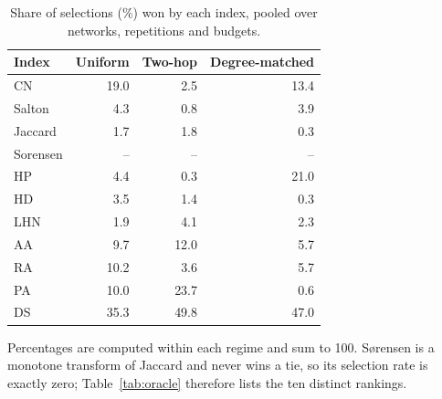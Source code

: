 \begin{table}[htbp]
\centering
\footnotesize
\caption{Share of selections (\%) won by each index, pooled over networks, repetitions and budgets.}
\label{tab:methods}
\begin{tabular}{l r r r}
\toprule
Index & Uniform & Two-hop & Degree-matched \\
\midrule
CN & 19.0 & 2.5 & 13.4 \\
Salton & 4.3 & 0.8 & 3.9 \\
Jaccard & 1.7 & 1.8 & 0.3 \\
Sorensen & -- & -- & -- \\
HP & 4.4 & 0.3 & 21.0 \\
HD & 3.5 & 1.4 & 0.3 \\
LHN & 1.9 & 4.1 & 2.3 \\
AA & 9.7 & 12.0 & 5.7 \\
RA & 10.2 & 3.6 & 5.7 \\
PA & 10.0 & 23.7 & 0.6 \\
DS & 35.3 & 49.8 & 47.0 \\
\bottomrule
\end{tabular}
\par\vspace{2pt}\begin{minipage}{\linewidth}\footnotesize Percentages are computed within each regime and sum to 100. S{\o}rensen is a monotone transform of Jaccard and never wins a tie, so its selection rate is exactly zero; Table~\ref{tab:oracle} therefore lists the ten distinct rankings.\end{minipage}
\end{table}

